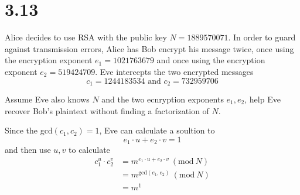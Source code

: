 \documentclass{article}
\newcommand{\Mod}[1]{\ (\mathrm{mod}\ #1)}
\begin{document}
\section*{3.13}
Alice decides to use RSA with the public key \(N = 1889570071\). In order to guard against
transmission errors, Alice has Bob encrypt his message twice, once using the encryption
exponent \(e_1 = 1021763679\) and once using the encryption exponent \(e_2 = 519424709\).
Eve intercepts the two encrypted messages
\begin{equation*}
    c_1 = 1244183534 \text{ and } c_2 = 732959706
\end{equation*}

Assume Eve also knows \(N\) and the two ecnryption exponents \(e_1, e_2\), help Eve recover
Bob's plaintext without finding a factorization of \(N\).

Since the gcd\((c_1, c_2) = 1\), Eve can calculate a soultion to
\begin{equation*}
    e_1 \cdot u + e_2 \cdot v = 1
\end{equation*}
and then use \(u, v\) to calculate
\begin{align*}
    c_1^u \cdot c_2^v & = m^{e_1\cdot u + e_2 \cdot v} \Mod{N} \\
                      & = m^{\text{gcd}(e_1, e_2)} \Mod{N}     \\
                      & = m^1
\end{align*}
\end{document}
